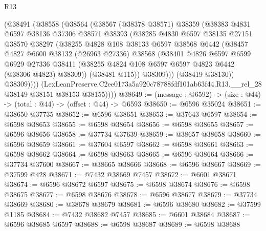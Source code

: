 \begin{lexlean}{R13}
\begin{coremodule}
            (@38491
              (@38558
                (@38564
                  (@38567
                    (@38378 @38571)
                    @38359
                    (@38383
                      @4831
                      @6597
                      @38136
                      @37306
                      @38571
                      @38393
                      (@38285
                        @4830
                        @6597
                        @38135
                        @27151
                        @38570
                        @38297
                        (@38255
                          @4828
                          @108
                          @38133
                          @6597
                          @38568
                          @6442
                          (@38457
                            @4827
                            @6600
                            @38132
                            (@26963 @27336)
                            @38568
                            (@38401
                              @4826
                              @6597
                              @6599
                              @6929
                              @27336
                              @38411
                              (@38255 @4824 @108 @6597 @6597 @4823 @6442 (@38306 @4823) @38309))
                            (@38481 @115))
                          @38309)))
                    (@38419 @38130))
                  @38309))))
          (LexLeanPreserve.C2ee0173a5a920c78788fdf101ab63f44.R13.__rel_28
            @38149
            @38151
            @38153
            @38155))))
@38649 := (message : @6592) -> (size : @44) -> (total : @44) -> (offset : @44) -> @6593
@38650 := @6596 @35024
@38651 := @38650 @37735
@38652 := @6596 @38651
@38653 := @37643 @6597
@38654 := @6598 @38653
@38655 := @6598 @38654
@38656 := @6598 @38655
@38657 := @6596 @38656
@38658 := @37734 @37639
@38659 := @38657 @38658
@38660 := @6596 @38659
@38661 := @37604 @6597
@38662 := @6598 @38661
@38663 := @6598 @38662
@38664 := @6598 @38663
@38665 := @6596 @38664
@38666 := @37734 @37600
@38667 := @38665 @38666
@38668 := @6596 @38667
@38669 := @37599 @428
@38671 := @7432 @38669 @7457
@38672 := @6601 @38671
@38674 := @6596 @38672 @6597
@38675 := @6598 @38674
@38676 := @6598 @38675
@38677 := @6598 @38676
@38678 := @6596 @38677
@38679 := @37734 @38669
@38680 := @38678 @38679
@38681 := @6596 @38680
@38682 := @37599 @1185
@38684 := @7432 @38682 @7457
@38685 := @6601 @38684
@38687 := @6596 @38685 @6597
@38688 := @6598 @38687
@38689 := @6598 @38688

\end{coremodule}
\end{lexlean}
